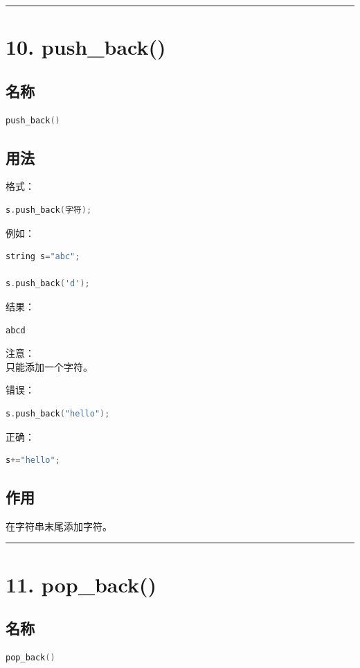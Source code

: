 \documentclass[9pt,twocolumn]{extarticle}
\begin{document}
\noindent\rule{\linewidth}{0.4pt}

\section{10. push\_back()}

\subsection{名称}
\begin{lstlisting}[language=C++]
push_back()
\end{lstlisting}

\subsection{用法}
格式：
\begin{lstlisting}[language=C++]
s.push_back(字符);
\end{lstlisting}
例如：
\begin{lstlisting}[language=C++]
string s="abc";

s.push_back('d');
\end{lstlisting}
结果：
\begin{lstlisting}
abcd
\end{lstlisting}
注意：\\
只能添加一个字符。

错误：
\begin{lstlisting}[language=C++]
s.push_back("hello");
\end{lstlisting}
正确：
\begin{lstlisting}[language=C++]
s+="hello";
\end{lstlisting}

\subsection{作用}
在字符串末尾添加字符。

\noindent\rule{\linewidth}{0.4pt}

\section{11. pop\_back()}

\subsection{名称}
\begin{lstlisting}[language=C++]
pop_back()
\end{lstlisting}
\end{document}
